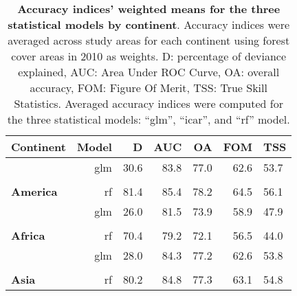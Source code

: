 \documentclass[
  12pt,
]{article}
\begin{document}
\begin{table}[H]

\caption{\label{tab:accuracy-cont}\textbf{Accuracy indices' weighted means for the three statistical models by continent}. Accuracy indices were averaged across study areas for each continent using forest cover areas in 2010 as weights. D: percentage of deviance explained, AUC: Area Under ROC Curve, OA: overall accuracy, FOM: Figure Of Merit, TSS: True Skill Statistics. Averaged accuracy indices were computed for the three statistical models: ``glm'', ``icar'', and ``rf'' model.\vspace{0.5cm}}
\centering
\begin{tabular}[t]{>{}lrrrrrl}
\toprule
Continent & Model & D & AUC & OA & FOM & TSS\\
\midrule
 & glm & 30.6 & 83.8 & 77.0 & 62.6 & 53.7\\

\cellcolor{gray!6}{} & \cellcolor{gray!6}{icar} & \cellcolor{gray!6}{40.0} & \cellcolor{gray!6}{87.2} & \cellcolor{gray!6}{79.9} & \cellcolor{gray!6}{66.6} & \cellcolor{gray!6}{59.4}\\

\multirow{-3}{*}{\raggedright\arraybackslash \textbf{America}} & rf & 81.4 & 85.4 & 78.2 & 64.5 & 56.1\\
\cmidrule{1-7}
 & glm & 26.0 & 81.5 & 73.9 & 58.9 & 47.9\\

\cellcolor{gray!6}{} & \cellcolor{gray!6}{icar} & \cellcolor{gray!6}{36.1} & \cellcolor{gray!6}{86.1} & \cellcolor{gray!6}{77.7} & \cellcolor{gray!6}{64.0} & \cellcolor{gray!6}{56.0}\\

\multirow{-3}{*}{\raggedright\arraybackslash \textbf{Africa}} & rf & 70.4 & 79.2 & 72.1 & 56.5 & 44.0\\
\cmidrule{1-7}
 & glm & 28.0 & 84.3 & 77.2 & 62.6 & 53.8\\

\cellcolor{gray!6}{} & \cellcolor{gray!6}{icar} & \cellcolor{gray!6}{40.1} & \cellcolor{gray!6}{88.0} & \cellcolor{gray!6}{80.2} & \cellcolor{gray!6}{66.5} & \cellcolor{gray!6}{59.8}\\

\multirow{-3}{*}{\raggedright\arraybackslash \textbf{Asia}} & rf & 80.2 & 84.8 & 77.3 & 63.1 & 54.8\\
\bottomrule
\end{tabular}
\end{table}
\end{document}
